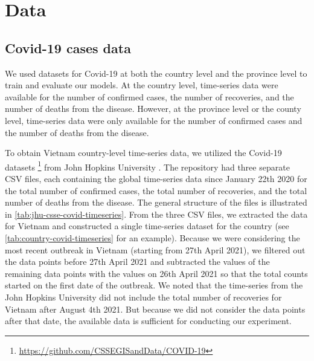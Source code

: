 \section{Data}
\label{sec:methodologies-data}

\subsection{Covid-19 cases data}
\label{sec:methodologies-data-covid19-cases}

We used datasets for Covid-19 at both the country level and the province level to train and evaluate our models.
At the country level, time-series data were available for the number of confirmed cases, the number of recoveries, and the number of deaths from the disease.
However, at the province level or the county level, time-series data were only available for the number of confirmed cases and the number of deaths from the disease.

To obtain Vietnam country-level time-series data, we utilized the Covid-19 datasets \footnote{\url{https://github.com/CSSEGISandData/COVID-19}} from John Hopkins University \cite{dongInteractiveWebbasedDashboard2020}.
The repository had three separate \gls{CSV} files, each containing the global time-series data since January 22th 2020 for the total number of confirmed cases, the total number of recoveries, and the total number of deaths from the disease.
The general structure of the files is illustrated in \autoref{tab:jhu-csse-covid-timeseries}.
From the three \gls{CSV} files, we extracted the data for Vietnam and constructed a single time-series dataset for the country (see \autoref{tab:country-covid-timeseries} for an example).
Because we were considering the most recent outbreak in Vietnam (starting from 27th April 2021), we filtered out the data points before 27th April 2021 and subtracted the values of the remaining data points with the values on 26th April 2021 so that the total counts started on the first date of the outbreak.
We noted that the time-series from the John Hopkins University did not include the total number of recoveries for Vietnam after August 4th 2021.
But because we did not consider the data points after that date, the available data is sufficient for conducting our experiment.

